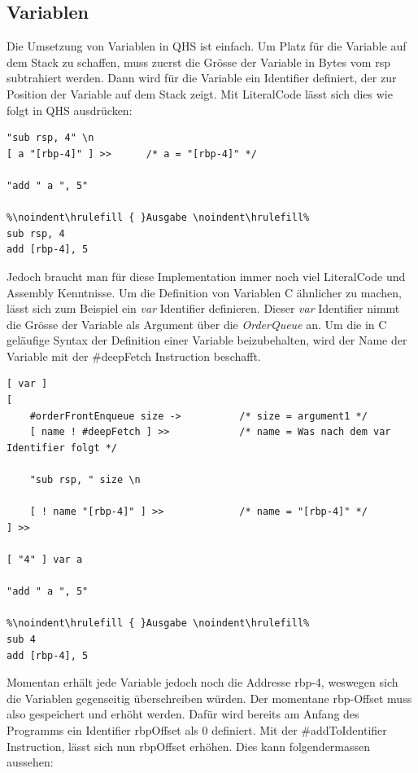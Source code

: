\subsection{Variablen} \label{sec:qhs-vars}
Die Umsetzung von Variablen in QHS ist einfach.
Um Platz für die Variable auf dem Stack zu schaffen, muss zuerst die Grösse der Variable in Bytes vom rsp subtrahiert werden.
Dann wird für die Variable ein Identifier definiert, der zur Position der Variable auf dem Stack zeigt.
Mit LiteralCode lässt sich dies wie folgt in QHS ausdrücken:

\begin{lstlisting}[language=QHS, caption=Definition einer Variable mit LiteralCode]
"sub rsp, 4" \n
[ a "[rbp-4]" ] >>      /* a = "[rbp-4]" */

"add " a ", 5"

%\noindent\hrulefill { }Ausgabe \noindent\hrulefill%
sub rsp, 4
add [rbp-4], 5
\end{lstlisting}

Jedoch braucht man für diese Implementation immer noch viel LiteralCode und Assembly Kenntnisse. Um die Definition von Variablen C ähnlicher zu machen, lässt sich zum Beispiel ein \textit{var} Identifier definieren.
Dieser \textit{var} Identifier nimmt die Grösse der Variable als Argument über die \textit{OrderQueue} an. Um die in C geläufige Syntax der Definition einer Variable beizubehalten,
wird der Name der Variable mit der \#deepFetch Instruction beschafft.

\begin{lstlisting}[language=QHS, caption=Definition einer Variable mit \textit{var} Identifier]
[ var ]
[
    #orderFrontEnqueue size ->          /* size = argument1 */
    [ name ! #deepFetch ] >>            /* name = Was nach dem var Identifier folgt */

    "sub rsp, " size \n

    [ ! name "[rbp-4]" ] >>             /* name = "[rbp-4]" */
] >> 

[ "4" ] var a 

"add " a ", 5"
    
%\noindent\hrulefill { }Ausgabe \noindent\hrulefill%
sub 4
add [rbp-4], 5
\end{lstlisting}

Momentan erhält jede Variable jedoch noch die Addresse rbp-4, weswegen sich die Variablen gegenseitig überschreiben würden. Der momentane rbp-Offset muss also gespeichert und erhöht werden.
Dafür wird bereits am Anfang des Programms ein Identifier rbpOffset als 0 definiert. Mit der \#addToIdentifier Instruction, lässt sich nun rbpOffset erhöhen. Dies kann folgendermassen aussehen:

